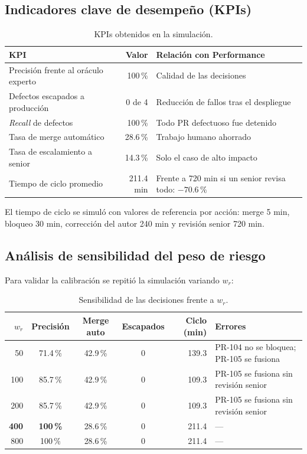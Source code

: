 \documentclass[11pt,a4paper]{article}
\begin{document}
\subsection{Indicadores clave de desempeño (KPIs)}

\begin{table}[H]
\centering
\caption{KPIs obtenidos en la simulación.}
\label{tab:kpis}
\begin{tabularx}{\textwidth}{@{}l r X@{}}
\toprule
\textbf{KPI} & \textbf{Valor} & \textbf{Relación con Performance} \\
\midrule
Precisión frente al oráculo experto & 100\,\% & Calidad de las decisiones \\
Defectos escapados a producción & 0 de 4 & Reducción de fallos tras el despliegue \\
\textit{Recall} de defectos & 100\,\% & Todo PR defectuoso fue detenido \\
Tasa de merge automático & 28.6\,\% & Trabajo humano ahorrado \\
Tasa de escalamiento a senior & 14.3\,\% & Solo el caso de alto impacto \\
Tiempo de ciclo promedio & 211.4 min & Frente a 720 min si un senior revisa todo: $-70.6\,\%$ \\
\bottomrule
\end{tabularx}
\end{table}

\noindent El tiempo de ciclo se simuló con valores de referencia por acción: merge 5 min, bloqueo
30 min, corrección del autor 240 min y revisión senior 720 min.

\subsection{Análisis de sensibilidad del peso de riesgo}

Para validar la calibración se repitió la simulación variando $w_r$:

\begin{table}[H]
\centering
\caption{Sensibilidad de las decisiones frente a $w_r$.}
\label{tab:sensibilidad}
\small\setlength{\tabcolsep}{4pt}
\begin{tabular}{@{}r c c c r p{5.2cm}@{}}
\toprule
$w_r$ & \textbf{Precisión} & \textbf{Merge auto} & \textbf{Escapados} & \textbf{Ciclo (min)} & \textbf{Errores} \\
\midrule
50  & 71.4\,\% & 42.9\,\% & 0 & 139.3 & PR-104 no se bloquea; PR-105 se fusiona \\
100 & 85.7\,\% & 42.9\,\% & 0 & 109.3 & PR-105 se fusiona sin revisión senior \\
200 & 85.7\,\% & 42.9\,\% & 0 & 109.3 & PR-105 se fusiona sin revisión senior \\
\textbf{400} & \textbf{100\,\%} & 28.6\,\% & 0 & 211.4 & --- \\
800 & 100\,\% & 28.6\,\% & 0 & 211.4 & --- \\
\bottomrule
\end{tabular}
\end{table}
\end{document}

